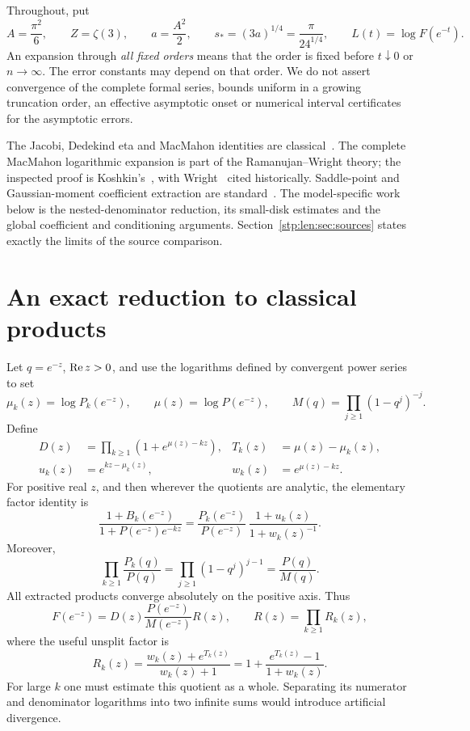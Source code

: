 \documentclass[11pt]{article}
\theoremstyle{remark}\newtheorem{remark}[theorem]{Remark}
\newcommand{\as}{s_*}\newcommand{\eps}{\varepsilon}\newcommand{\poc}[2]{(#1;#2)_\infty}
\begin{document}
Throughout, put
\begin{equation}\label{stp:len:eq:constants}
 A=\frac{\pi^2}{6},\qquad Z=\zeta(3),\qquad a=\frac{A^2}{2},\qquad
 \as=(3a)^{1/4}=\frac{\pi}{24^{1/4}},\qquad L(t)=\log F(e^{-t}).
\end{equation}
An expansion through \emph{all fixed orders} means that the order is fixed before $t\downarrow0$ or $n\to\infty$. The error constants may depend on that order. We do not assert convergence of the complete formal series, bounds uniform in a growing truncation order, an effective asymptotic onset or numerical interval certificates for the asymptotic errors.

The Jacobi, Dedekind eta and MacMahon identities are classical~\cite{dlmfjacobi,dlmftheta,dlmfeta,dlmfmacmahon}. The complete MacMahon logarithmic expansion is part of the Ramanujan--Wright theory; the inspected proof is Koshkin's~\cite{koshkin}, with Wright~\cite{wright} cited historically. Saddle-point and Gaussian-moment coefficient extraction are standard~\cite{fs}. The model-specific work below is the nested-denominator reduction, its small-disk estimates and the global coefficient and conditioning arguments. Section~\ref{stp:len:sec:sources} states exactly the limits of the source comparison.

\section{An exact reduction to classical products}\label{stp:len:sec:reduction}
Let $q=e^{-z}$, $\operatorname{Re} z>0$, and use the logarithms defined by convergent power series to set
\[
 \mu_k(z)=\log P_k(e^{-z}),\qquad \mu(z)=\log P(e^{-z}),\qquad
 M(q)=\prod_{j\ge1}(1-q^j)^{-j}.
\]
Define
\begin{align*}
 D(z)&=\prod_{k\ge1}(1+e^{\mu(z)-kz}),&
 T_k(z)&=\mu(z)-\mu_k(z),\\
 u_k(z)&=e^{kz-\mu_k(z)},&w_k(z)&=e^{\mu(z)-kz}.
\end{align*}
For positive real $z$, and then wherever the quotients are analytic, the elementary factor identity is
\[
 \frac{1+B_k(e^{-z})}{1+P(e^{-z})e^{-kz}}
 =\frac{P_k(e^{-z})}{P(e^{-z})}\,
   \frac{1+u_k(z)}{1+w_k(z)^{-1}}.
\]
Moreover,
\[
 \prod_{k\ge1}\frac{P_k(q)}{P(q)}
 =\prod_{j\ge1}(1-q^j)^{j-1}=\frac{P(q)}{M(q)}.
\]
All extracted products converge absolutely on the positive axis. Thus
\begin{equation}\label{stp:len:eq:factorization}
 F(e^{-z})=D(z)\frac{P(e^{-z})}{M(e^{-z})}R(z),\qquad
 R(z)=\prod_{k\ge1}R_k(z),
\end{equation}
where the useful unsplit factor is
\begin{equation}\label{stp:len:eq:Rk}
 R_k(z)=\frac{w_k(z)+e^{T_k(z)}}{w_k(z)+1}
       =1+\frac{e^{T_k(z)}-1}{1+w_k(z)}.
\end{equation}
For large $k$ one must estimate this quotient as a whole. Separating its numerator and denominator logarithms into two infinite sums would introduce artificial divergence.
\end{document}
